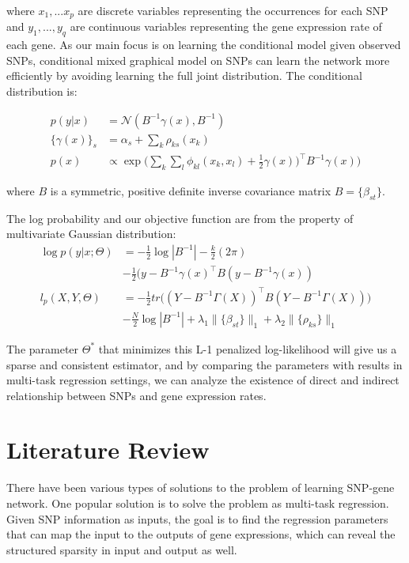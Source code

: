 \documentclass{article}
\begin{document}
where $x_1, ... x_p$ are discrete variables representing the occurrences for each SNP and $y_1, ..., y_q$ are continuous variables representing the gene expression rate of each gene. As our main focus is on learning the conditional model given observed SNPs, conditional mixed graphical model on SNPs can learn the network more efficiently by avoiding learning the full joint distribution. The conditional distribution is:

\begin{align}
p(y|x) &= \mathcal{N}(B^{-1}\gamma(x), B^{-1}) \label{eq:cond_prob}\\
\{\gamma(x)\}_s &= \alpha_s + \sum_{k} \rho_{ks}(x_k) \\
p(x) &\propto \exp \Big( \sum_{k} \sum_{l} \phi_{kl}(x_k, x_l) + \frac{1}{2} \gamma(x))^\intercal B^{-1} \gamma(x) \Big)
\end{align}

where $B$ is a symmetric, positive definite inverse covariance matrix $B = \{ \beta_{st}\}$.

The log probability and our objective function are from the property of multivariate Gaussian distribution:
\begin{align}
\log p(y | x; \Theta) &= -\frac{1}{2}\log |B^{-1}| -\frac{k}{2} (2 \pi) \nonumber    \\
& -\frac{1}{2} (y - B^{-1} \gamma(x)^\intercal B (y - B^{-1} \gamma(x)) \\
l_p(X, Y, \Theta) &= -\frac{1}{2} tr\Big((Y - B^{-1} \Gamma(X))^\intercal B (Y - B^{-1} \Gamma(X)) \Big) \nonumber \\
& -\frac{N}{2} \log|B^{-1}| + \lambda_1 \|\{\beta_{st}\}\|_1 + \lambda_2 \|\{\rho_{ks}\}\|_1 \label{eq:obj}
\end{align}

The parameter $\Theta^*$ that minimizes this L-1 penalized log-likelihood will give us a sparse and consistent estimator, and by comparing the parameters with results in multi-task regression settings, we can analyze the existence of direct and indirect relationship between SNPs and gene expression rates.

\section{Literature Review}
\label{LiteratureReview}

There have been various types of solutions to the problem of learning SNP-gene network. One popular solution is to solve the problem as multi-task regression.
Given SNP information as inputs, the goal is to find the regression parameters that can map the input to the outputs of gene expressions, which can reveal the structured sparsity in input and output as well.
\end{document}
